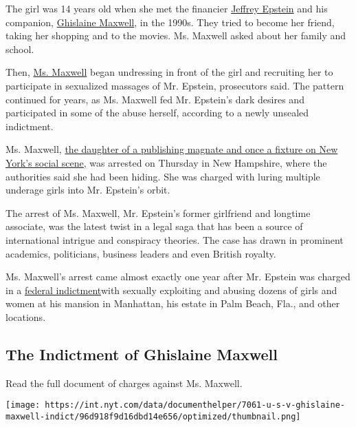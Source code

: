 The girl was 14 years old when she met the financier
\href{https://www.nytimes.com/2020/07/13/nyregion/ghislaine-maxwell-jeffrey-epstein.html}{Jeffrey
Epstein} and his companion,
\href{https://www.nytimes.com/2020/07/14/nyregion/ghislaine-maxwell-bail.html}{Ghislaine
Maxwell}, in the 1990s. They tried to become her friend, taking her
shopping and to the movies. Ms. Maxwell asked about her family and
school.

Then,
\href{https://www.nytimes.com/2020/07/14/nyregion/ghislaine-maxwell-bail.html}{Ms.
Maxwell} began undressing in front of the girl and recruiting her to
participate in sexualized massages of Mr. Epstein, prosecutors said. The
pattern continued for years, as Ms. Maxwell fed Mr. Epstein's dark
desires and participated in some of the abuse herself, according to a
newly unsealed indictment.

Ms. Maxwell,
\href{https://www.nytimes.com/2019/07/15/us/ghislaine-maxwell-epstein.html}{the
daughter of a publishing magnate and once a fixture on New York's social
scene,} was arrested on Thursday in New Hampshire, where the authorities
said she had been hiding. She was charged with luring multiple underage
girls into Mr. Epstein's orbit.

The arrest of Ms. Maxwell, Mr. Epstein's former girlfriend and longtime
associate, was the latest twist in a legal saga that has been a source
of international intrigue and conspiracy theories. The case has drawn in
prominent academics, politicians, business leaders and even British
royalty.

Ms. Maxwell's arrest came almost exactly one year after Mr. Epstein was
charged in a
\href{https://www.nytimes.com/2019/07/08/nyregion/jeffrey-epstein-charges.html?module=inline}{federal
indictment}with sexually exploiting and abusing dozens of girls and
women at his mansion in Manhattan, his estate in Palm Beach, Fla., and
other locations.

\hypertarget{the-indictment-of-ghislaine-maxwell}{%
\subsection{The Indictment of Ghislaine
Maxwell}\label{the-indictment-of-ghislaine-maxwell}}

Read the full document of charges against Ms. Maxwell.

\texttt{[image: https://int.nyt.com/data/documenthelper/7061-u-s-v-ghislaine-maxwell-indict/96d918f9d16dbd14e656/optimized/thumbnail.png]}

